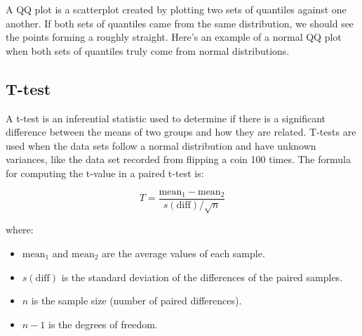 \documentclass[11pt]{article}
\begin{document}
A QQ plot is a scatterplot created by plotting two sets of quantiles against one another. If both sets of quantiles came from the same distribution, we should see the points forming a roughly straight. Here's an example of a normal QQ plot when both sets of quantiles truly come from normal distributions.
\subsection{T-test}
A t-test is an inferential statistic used to determine if there is a significant difference between the means of two groups and how they are related. T-tests are used when the data sets follow a normal distribution and have unknown variances, like the data set recorded from flipping a coin 100 times.\cite{ttest_investopedia}
The formula for computing the t-value in a paired t-test is:

\[
T = \frac{\text{mean}_1 - \text{mean}_2}{s(\text{diff}) / \sqrt{n}}
\]

where:
\begin{itemize}
    \item \(\text{mean}_1\) and \(\text{mean}_2\) are the average values of each sample.
    \item \(s(\text{diff})\) is the standard deviation of the differences of the paired samples.
    \item \(n\) is the sample size (number of paired differences).
    \item \(n - 1\) is the degrees of freedom.
\end{itemize}
\end{document}
